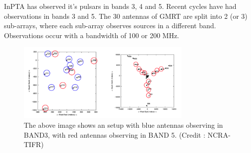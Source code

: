 \documentclass{article}
\begin{document}
InPTA has observed it’s pulsars in bands 3, 4 and 5. 
Recent cycles have had observations in bands 3 and 5.
The 30 antennas of GMRT are split into 2 (or 3) sub-arrays, where each sub-array observes sources in a different band. Observations occur with a bandwidth of 100 or 200 MHz. 
\begin{figure}[htbp]
\begin{center}
\includegraphics[width=0.75\textwidth]{Images/V2_2.png}
\caption{The above  image shows an setup with blue antennas observing in BAND3, with red antennas observing in BAND 5. (Credit : NCRA-TIFR)}
\end{center}
\end{figure}
\newpage
\end{document}
